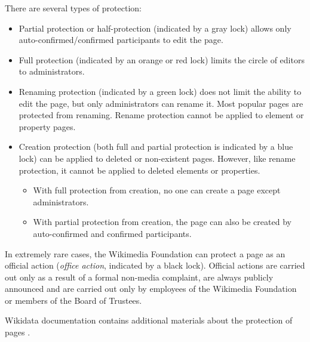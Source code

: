 There are several types of protection:
\begin{itemize}
\item Partial protection or half-protection (indicated by a gray lock) allows only auto-confirmed/confirmed participants to edit the page.
  \item Full protection (indicated by an orange or red lock) limits the circle of editors to administrators.
  \item Renaming protection (indicated by a green lock) does not limit the ability to edit the page, but only administrators can rename it. Most popular pages are protected from renaming. Rename protection cannot be applied to element or property pages.
  \item Creation protection (both full and partial protection is indicated by a blue lock) can be applied to deleted or non-existent pages. However, like rename protection, it cannot be applied to deleted elements or properties.
  \begin{itemize}
	\item With full protection from creation, no one can create a page except administrators.
	\item With partial protection from creation, the page can also be created by auto-confirmed and confirmed participants.
  \end{itemize}
\end{itemize}

In extremely rare cases, the Wikimedia Foundation can protect a page as an official action (\textit{office action}, indicated by a black lock). Official actions are carried out only as a result of a formal non-media complaint, are always publicly announced and are carried out only by employees of the Wikimedia Foundation or members of the Board of Trustees.

Wikidata documentation contains additional materials about the protection of pages\protect\footnotemark
{}.